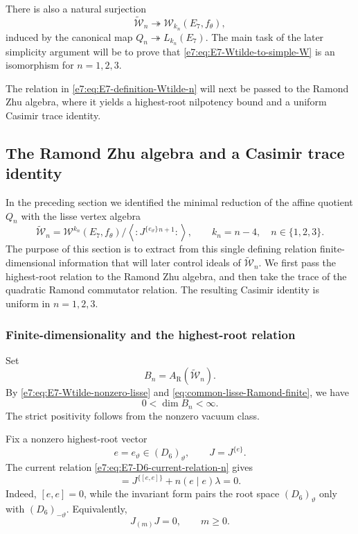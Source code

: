 \documentclass[11pt,reqno]{amsart}
\theoremstyle{definition}
\theoremstyle{remark}
\begin{document}
There is also a natural surjection
\begin{equation}
  \widetilde{\mathcal W}_n
  \twoheadrightarrow
  \mathcal W_{k_n}(E_7,f_\theta),
  \label{e7:eq:E7-Wtilde-to-simple-W}
\end{equation}
induced by the canonical map
\(Q_n\twoheadrightarrow L_{k_n}(E_7)\).  The main task of the later
simplicity argument will be to prove that
\eqref{e7:eq:E7-Wtilde-to-simple-W} is an isomorphism for
\(n=1,2,3\).

The relation in \eqref{e7:eq:E7-definition-Wtilde-n} will next be passed to the
Ramond Zhu algebra, where it yields a highest-root nilpotency bound and a
uniform Casimir trace identity.



\subsection{The Ramond Zhu algebra and a Casimir trace identity}
\label{e7:sec:Ramond-Casimir-identity}

In the preceding section we identified the minimal reduction of the affine
quotient $Q_n$ with the lisse vertex algebra
\[
  \widetilde{\mathcal W}_n
  =
  \mathcal W^{k_n}(E_7,f_\theta)
  \Big/
  \left\langle
    :J^{\{e_\vartheta\}}{}^{n+1}:
  \right\rangle,
  \qquad
  k_n=n-4,
  \quad n\in\{1,2,3\}.
\]
The purpose of this section is to extract from this single defining relation
finite-dimensional information that will later control ideals of
$\widetilde{\mathcal W}_n$.  We first pass the highest-root relation to the
Ramond Zhu algebra, and then take the trace of the quadratic Ramond
commutator relation.  The resulting Casimir identity is uniform in
$n=1,2,3$.

\subsubsection{Finite-dimensionality and the highest-root relation}


Set
\begin{equation*}
  B_n=A_{\mathrm R}(\widetilde{\mathcal W}_n).
\end{equation*}
By \eqref{e7:eq:E7-Wtilde-nonzero-lisse} and
\eqref{eq:common-lisse-Ramond-finite}, we have
\begin{equation*}
  0<\dim B_n<\infty.
\end{equation*}
The strict positivity follows from the nonzero vacuum class.

Fix a nonzero highest-root vector
\begin{equation*}
  e=e_\vartheta\in(D_6)_\vartheta,
  \qquad
  J=J^{\{e\}}.
\end{equation*}
The current relation \eqref{e7:eq:E7-D6-current-relation-n} gives
\begin{equation*}
  [J_\lambda J]
  =J^{\{[e,e]\}}+n(e\mid e)\lambda=0.
\end{equation*}
Indeed, $[e,e]=0$, while the invariant form pairs the root space
$(D_6)_\vartheta$ only with $(D_6)_{-\vartheta}$.  Equivalently,
\begin{equation}
  J_{(m)}J=0,
  \qquad m\ge0.
  \label{e7:eq:E7-highest-root-current-products-zero}
\end{equation}
\end{document}
